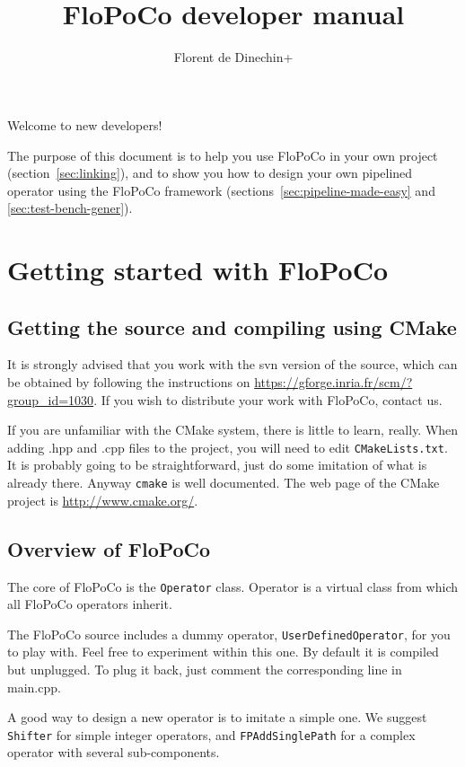 \documentclass{article}
\title{\scalebox{0.3}{\mbox{}}\\
FloPoCo  developer manual
}
\author{Florent de Dinechin+}
\begin{document}
 
\sloppy



\maketitle


Welcome to new developers! 

The purpose of this document is to help you use FloPoCo in your own
project (section~\ref{sec:linking}), and to show you how to design your own pipelined operator
using the FloPoCo framework (sections~\ref{sec:pipeline-made-easy} and \ref{sec:test-bench-gener}). 

 \section{Getting started with FloPoCo\label{sec:getting-started}}


\subsection{Getting the source and compiling using CMake}

It is strongly advised that you work with the svn version of the
source, which can be obtained by following the instructions on
\url{https://gforge.inria.fr/scm/?group_id=1030}. If you wish to
distribute your work with FloPoCo,  contact us.

If you are unfamiliar with the CMake system, there is little to learn,
really. When adding .hpp and .cpp files to the project, you will need
to edit \texttt{CMakeLists.txt}. It is probably going to be straightforward,
just do some imitation of what is already there. Anyway \texttt{cmake} is well
documented. The web page of the CMake project is \url{http://www.cmake.org/}.


\subsection{Overview of FloPoCo}

The core of FloPoCo is the \texttt{Operator} class. 
Operator is a virtual class from which all FloPoCo operators inherit. 

The FloPoCo source includes a dummy operator, \texttt{UserDefinedOperator}, for you to play with. 
Feel free to experiment within this one. 
By default it is compiled but unplugged. To plug it back, just comment the corresponding line in main.cpp.

A good way to design a new operator is to imitate a simple one. We suggest
\texttt{Shifter} for simple integer operators, and \texttt{FPAddSinglePath}
for a complex operator with several sub-components.
\end{document}
